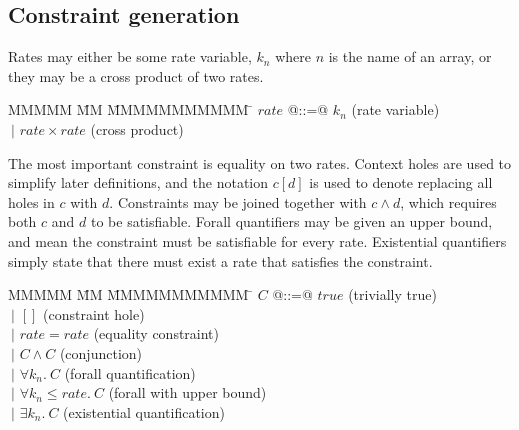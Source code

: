 \newcommand{\constr}[1]{\llbracket #1 \rrbracket}
\newcommand{\hole}[0]{[]}
\newcommand{\fillhole}[2]{#1\left[#2\right]}

\subsection{Constraint generation}
Rates may either be some rate variable, $k_n$ where $n$ is the name of an array, or they may be a cross product of two rates.

\begin{tabbing}
MMMMM       \= MM \= MMMMMMMMMMM \= \kill
$rate$      \> @::=@ \> $k_n$               \> (rate variable)\\
            \> $~|$  \> $rate \times rate$  \> (cross product) \\
\end{tabbing}

The most important constraint is equality on two rates.
Context holes are used to simplify later definitions, and the notation $\fillhole{c}{d}$ is used to denote replacing all holes in $c$ with $d$.
Constraints may be joined together with $c \wedge d$, which requires both $c$ and $d$ to be satisfiable.
Forall quantifiers may be given an upper bound, and mean the constraint must be satisfiable for every rate.
Existential quantifiers simply state that there must exist a rate that satisfies the constraint.


\begin{tabbing}
MMMMM       \= MM \= MMMMMMMMMMM \= \kill
$C$          \> @::=@ \> $true$                                 \> (trivially true) \\
             \> $~|$  \> $\hole$                                \> (constraint hole) \\
             \> $~|$  \> $rate = rate$                          \> (equality constraint) \\
             \> $~|$  \> $C \wedge C$                           \> (conjunction) \\
             \> $~|$  \> $\forall k_n.\ C$                      \> (forall quantification) \\
             \> $~|$  \> $\forall k_n \le rate.\ C$             \> (forall with upper bound) \\
             \> $~|$  \> $\exists k_n.\ C$                      \> (existential quantification)\\
\end{tabbing}


